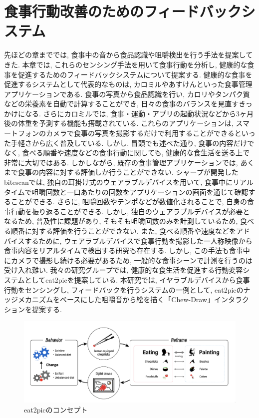 
\chapter{食事行動改善のためのフィードバックシステム}
\label{cha:intervention}

先ほどの章まででは, 食事中の音から食品認識や咀嚼検出を行う手法を提案してきた. 本章では, これらのセンシング手法を用いて食事行動を分析し, 健康的な食事を促進するためのフィードバックシステムについて提案する. 健康的な食事を促進するシステムとして代表的なものは, カロミルやあすけんといった食事管理アプリケーションである. 食事の写真から食品認識を行い, カロリやタンパク質などの栄養素を自動で計算することができ, 日々の食事のバランスを見直すきっかけになる. さらにカロミルでは, 食事・運動・アプリの起動状況などから3ヶ月後の体重を予測する機能も搭載されている. これらのアプリケーションは, スマートフォンのカメラで食事の写真を撮影するだけで利用することができるといった手軽さから広く普及している. しかし, 冒頭でも述べた通り, 食事の内容だけでなく, 食べる順番や速度などの食事行動に関しても, 健康的な食生活を送る上で非常に大切ではある. しかしながら, 既存の食事管理アプリケーションでは, あくまで食事の内容に対する評価しか行うことができない. シャープが開発したbitescanでは, 独自の耳掛け式のウェアラブルデバイスを用いて, 食事中にリアルタイムで咀嚼回数と一口あたりの回数をアプリケーションの画面を通じて確認することができる. さらに, 咀嚼回数やテンポなどが数値化されることで, 自身の食事行動を振り返ることができる. しかし, 独自のウェアラブルデバイスが必要となるため, 普及性に課題があり, そもそも咀嚼回数のみを計測しているため, 食べる順番に対する評価を行うことができない. また, 食べる順番や速度などをアドバイスするために, ウェアラブルデバイスで食事行動を撮影した一人称映像から食事内容をリアルタイムで検出する研究も存在する. しかし, この手法も食事中にカメラで撮影し続ける必要があるため, 一般的な食事シーンで計測を行うのは受け入れ難い. 我々の研究グループでは, 健康的な食生活を促進する行動変容システムとしてeat2picを提案している.\cite{10.1145/3580784} 本研究では, イヤラブルデバイスから食事行動をセンシングし, フィードバックを行うシステムの一例として, eat2picのナッジメカニズムをベースにした咀嚼音から絵を描く「Chew-Draw」インタラクションを提案する.

\begin{figure}[t]
    \begin{center}
        \includegraphics[clip, width=1.0\hsize]{img/eat2pic-concept.png}
        \caption{eat2picのコンセプト}
        \label{fig:eat2pic-concept}
    \end{center}
\end{figure}

